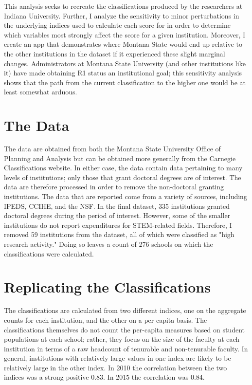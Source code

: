 \documentclass{article}\usepackage[]{graphicx}\usepackage[]{color}
\begin{document}
This analysis seeks to recreate the classifications produced by the researchers at Indiana University. Further, I analyze the sensitivity to minor perturbations in the underlying indices used to calculate each score for in order to determine which variables most strongly affect the score for a given institution.  Moreover, I create an app that demonstrates where Montana State would end up relative to the other institutions in the dataset if it experienced these slight marginal changes. Administrators at Montana State University (and other institutions like it) have made obtaining R1 status an institutional goal; this sensitivity analysis shows that the path from the current classification to the higher one would be at least somewhat arduous. 

\section{The Data}

The data are obtained from both the Montana State University Office of Planning and Analysis but can be obtained more generally from the Carnegie Classifications website. In either case, the data contain data pertaining to many levels of institutions; only those that grant doctoral degrees are of interest. The data are therefore processed in order to remove the non-doctoral granting institutions. The data that are reported come from a variety of sources, including IPEDS, CCIHE, and the NSF. 
In the final dataset, 335 institutions granted doctoral degrees during the period of interest. However, some of the smaller institutions do not report expenditures for STEM-related fields.   Therefore, I removed 59 institutions from the dataset, all of which were classified as "high research activity."  Doing so leaves a count of 276 schools on which the classifications were calculated. 




\section{Replicating the Classifications}
The classifications are calculated from two different indices, one on the aggregate counts for each institution, and the other on a per-capita basis. The classifications themselves do not count the per-capita measures based on student populations at each school; rather, they focus on the size of the faculty at each institution in terms of a raw headcount of tenurable and non-tenurable faculty.
In general, institutions with relatively large values in one index are likely to be relatively large in the other index. In 2010 the correlation between the two indices was a strong positive 0.83. In 2015 the correlation was 0.84.  
\end{document}
